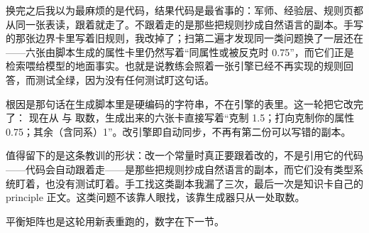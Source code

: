 换完之后我以为最麻烦的是代码，结果代码是最省事的：军师、经验层、规则页都从同一张表读，跟着就走了。不跟着走的是那些把规则抄成自然语言的副本。手写的那张边界卡里写着旧规则，我改掉了；扫第二遍才发现同一类问题换了一层还在——六张由脚本生成的属性卡里仍然写着“同属性或被反克时 0.75”，而它们正是检索喂给模型的地面事实。也就是说教练会照着一张引擎已经不再实现的规则回答，而测试全绿，因为没有任何测试盯这句话。

根因是那句话在生成脚本里是硬编码的字符串，不在引擎的表里。这一轮把它改完了： 现在从  与  取数，生成出来的六张卡直接写着“克制 1.5；打向克制你的属性 0.75；其余（含同系）1”。改引擎即自动同步，不再有第二份可以写错的副本。

值得留下的是这条教训的形状：改一个常量时真正要跟着改的，不是引用它的代码——代码会自动跟着走——是那些把规则抄成自然语言的副本，而它们没有类型系统盯着，也没有测试盯着。手工找这类副本我漏了三次，最后一次是知识卡自己的 principle 正文。这类问题不该靠人眼找，该靠生成器只从一处取数。

平衡矩阵也是这轮用新表重跑的，数字在下一节。
